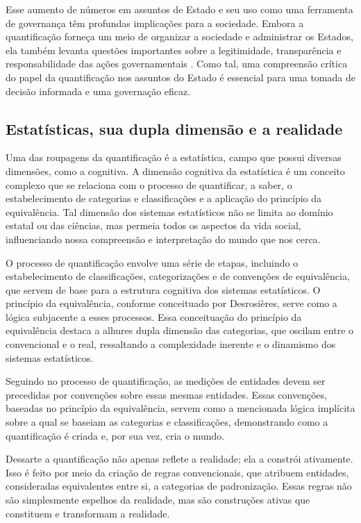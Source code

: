 Esse aumento de números em assuntos de Estado e seu uso como uma ferramenta de governança têm profundas implicações para a sociedade. Embora a quantificação forneça um meio de organizar a sociedade e administrar os Estados, ela também levanta questões importantes sobre a legitimidade, transparência e responsabilidade das ações governamentais \cite{berman2018sociology}. Como tal, uma compreensão crítica do papel da quantificação nos assuntos do Estado é essencial para uma tomada de decisão informada e uma governação eficaz.

\subsection{Estatísticas, sua dupla dimensão e a realidade}

Uma das roupagens da quantificação é a estatística, campo que possui diversas dimensões, como a cognitiva. A dimensão cognitiva da estatística é um conceito complexo que se relaciona com o processo de quantificar, a saber, o estabelecimento de categorias e classificações e a aplicação do princípio da equivalência. Tal dimensão dos sistemas estatísticos não se limita ao domínio estatal ou das ciências, mas permeia todos os aspectos da vida social, influenciando nossa compreensão e interpretação do mundo que nos cerca.

O processo de quantificação envolve uma série de etapas, incluindo o estabelecimento de classificações, categorizações e de convenções de equivalência, que servem de base para a estrutura cognitiva dos sistemas estatísticos. O princípio da equivalência, conforme conceituado por Desrosières, serve como a lógica subjacente a esses processos. Essa conceituação do princípio da equivalência destaca a alhures dupla dimensão das categorias, que oscilam entre o convencional e o real, ressaltando a complexidade inerente e o dinamismo dos sistemas estatísticos.

Seguindo no processo de quantificação, as medições de entidades devem ser precedidas por convenções sobre essas mesmas entidades. Essas convenções, baseadas no princípio da equivalência, servem como a mencionada lógica implícita sobre a qual se baseiam as categorias e classificações, demonstrando como a quantificação é criada e, por sua vez, cria o mundo.

Dessarte a quantificação não apenas reflete a realidade; ela a constrói ativamente. Isso é feito por meio da criação de regras convencionais, que atribuem entidades, consideradas equivalentes entre si, a categorias de padronização. Essas regras não são simplesmente espelhos da realidade, mas são construções ativas que constituem e transformam a realidade.

